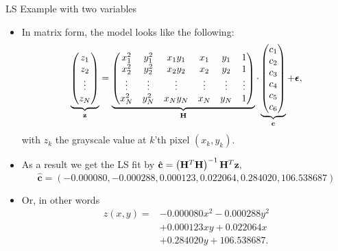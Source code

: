 \documentclass[10pt, aspectratio=169]{beamer} %
\newcommand{\HH}{{\bf H}}
\newcommand{\z}{{\bf z}}
\begin{document}
\begin{frame}
[allowframebreaks=0.8]
{LS Example with two variables}
\begin{itemize}

\item In matrix form, the model looks like the following:
\begin{equation}
\underbrace{
\begin{pmatrix}
z_1\\z_2\\ \vdots\\ z_N
\end{pmatrix}}_{\bf z}
 = 
\underbrace{\begin{pmatrix}
x_1^2 & y_1^2 & x_1y_1 & x_1 & y_1 & 1\\
x_2^2 & y_2^2 & x_2y_2 & x_2 & y_2 & 1\\
\vdots&\vdots&\vdots&\vdots&\vdots&\vdots\\
x_N^2 & y_N^2 & x_Ny_N & x_N & y_N & 1
\end{pmatrix}}_{\bf H} \cdot 
\underbrace{\begin{pmatrix}
c_1\\c_2\\c_3\\c_4\\c_5\\c_6
\end{pmatrix}}_{\bf c} + \boldsymbol{\epsilon},
\label{eq:microscope}
\end{equation}
with $z_k$ the grayscale value at $k$'th pixel $(x_k, y_k)$. 
\item As a result we get the LS fit by $\hat{\mathbf{c}} = \left(\HH^T\HH\right)^{-1}\HH^T\z,$
\[
\hat{\mathbf{c}} = (-0.000080, -0.000288, \allowbreak 0.000123, \allowbreak 0.022064, \allowbreak
0.284020, 106.538687)
\]
\item Or, in other words
\begin{align*}
z(x,y) = &-0.000080x^2 -0.000288y^2 \\
       &+0.000123xy +0.022064x \\
			 &+0.284020y +106.538687.
\end{align*}

\end{itemize}

\end{frame}
\end{document}

